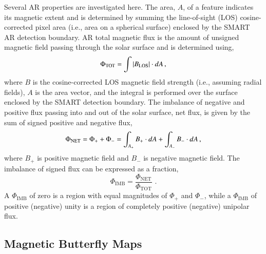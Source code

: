 \documentclass[namedreferences]{solarphysics}
\begin{document}
\begin{article}
Several AR properties are investigated here. The area, $A$, of a feature indicates its magnetic extent and is determined by summing the line-of-sight (LOS) cosine-corrected pixel area (i.e., area on a spherical surface) enclosed by the SMART AR detection boundary. 
AR total magnetic flux is the amount of unsigned magnetic field passing through the solar surface and is determined using,
\begin{equation}\label{eqn:flux}
\Phi_{\mathrm{TOT}}=\int{|{B_{\mathrm{LOS}}}|\cdot d{A}} \mbox{\,,}
\end{equation}
where ${B}$ is the cosine-corrected LOS magnetic field strength (i.e., assuming radial fields), ${A}$ is the area vector, and the integral is performed over the surface enclosed by the SMART detection boundary. The imbalance of negative and positive flux passing into and out of the solar surface, net flux, is given by the sum of signed positive and negative flux,
\begin{equation}
\Phi_{\mathrm{NET}}=\Phi_{+}+\Phi_{-}=\int_{A_+}{{B_{+}}\cdot d{A}} + \int_{A_-}{B_{-}\cdot dA} \mbox{\,,}
\end{equation}
where ${B_{+}}$ is positive magnetic field and ${B_{-}}$ is negative magnetic field.
The imbalance of signed flux can be expressed as a fraction,
\begin{equation}
\Phi_{\mathrm{IMB}} = \frac{\Phi_{\mathrm{NET}}}{\Phi_{\mathrm{TOT}}} \mbox{\ .}
\end{equation}
A $\Phi_{\mathrm{IMB}}$ of zero is a region with equal magnitudes of $\Phi_{+}$ and $\Phi_{-}$, while a $\Phi_{\mathrm{IMB}}$ of positive (negative) unity is a region of completely positive (negative) unipolar flux. %


\subsection{Magnetic Butterfly Maps}\label{sub:magbutt}


\end{article}
\end{document}
